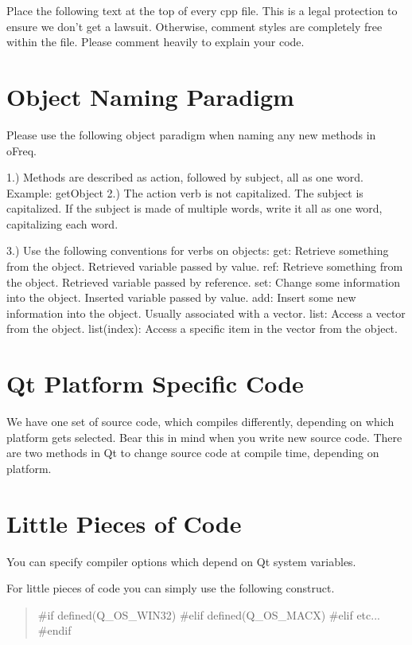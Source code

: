 Place the following text at the top of every cpp file. This is a legal protection to ensure we don't get a lawsuit. Otherwise, comment styles are completely free within the file. Please comment heavily to explain your code. \hypertarget{ObjectParadigm}{}\section{Object Naming Paradigm}\label{ObjectParadigm}
Please use the following object paradigm when naming any new methods in o\-Freq.

1.) Methods are described as action, followed by subject, all as one word. Example\-: get\-Object 2.) The action verb is not capitalized. The subject is capitalized. If the subject is made of multiple words, write it all as one word, capitalizing each word.

3.) Use the following conventions for verbs on objects\-: get\-: Retrieve something from the object. Retrieved variable passed by value. ref\-: Retrieve something from the object. Retrieved variable passed by reference. set\-: Change some information into the object. Inserted variable passed by value. add\-: Insert some new information into the object. Usually associated with a vector. list\-: Access a vector from the object. list(index)\-: Access a specific item in the vector from the object. \hypertarget{Qt_Platform_Code}{}\section{Qt Platform Specific Code}\label{Qt_Platform_Code}
We have one set of source code, which compiles differently, depending on which platform gets selected. Bear this in mind when you write new source code. There are two methods in Qt to change source code at compile time, depending on platform.

\section*{Little Pieces of Code}

You can specify compiler options which depend on Qt system variables.

For little pieces of code you can simply use the following construct.

\begin{quotation}
\#if defined(\-Q\-\_\-\-O\-S\-\_\-\-W\-I\-N32) \#elif defined(\-Q\-\_\-\-O\-S\-\_\-\-M\-A\-C\-X) \#elif etc... \#endif

\end{quotation}


